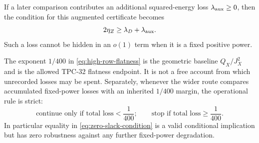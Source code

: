 \begin{remark}
If a later comparison contributes an additional squared-energy loss
\(\lambda_{\rm aux}\ge0\), then the condition for this augmented
certificate becomes
\[
 2\eta_Z\ge\lambda_D+\lambda_{\rm aux}.
\]
Such a loss cannot be hidden in an \(o(1)\) term when it is a fixed
positive power.
\end{remark}

\begin{remark}
The exponent \(1/400\) in \eqref{eq:high-row-flatness} is the
geometric baseline \(Q_X/J_X^2\) and is the allowed TPC-32 flatness
endpoint.  It is not a free account from which unrecorded losses may
be spent.  Separately, whenever the wider route compares accumulated
fixed-power losses with an inherited \(1/400\) margin, the operational
rule is strict:
\[
 \text{continue only if total loss}<\frac1{400};
 \qquad
 \text{stop if total loss}\ge\frac1{400}.
\]
In particular equality in \eqref{eq:zero-slack-condition} is a valid
conditional implication but has zero robustness against any further
fixed-power degradation.
\end{remark}
